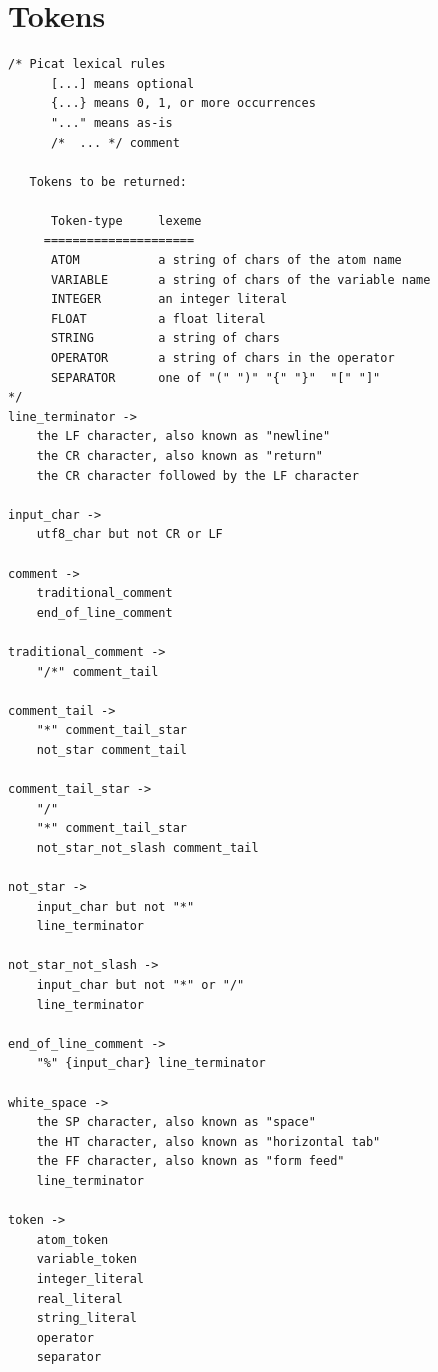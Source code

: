 
\chapter{\label{chapter:lex}Tokens}
\begin{scriptsize}
\begin{verbatim}
/* Picat lexical rules 
      [...] means optional
      {...} means 0, 1, or more occurrences
      "..." means as-is
      /*  ... */ comment

   Tokens to be returned:

      Token-type     lexeme
     =====================
      ATOM           a string of chars of the atom name
      VARIABLE       a string of chars of the variable name
      INTEGER        an integer literal
      FLOAT          a float literal
      STRING         a string of chars 
      OPERATOR       a string of chars in the operator
      SEPARATOR      one of "(" ")" "{" "}"  "[" "]"  
*/
line_terminator ->
    the LF character, also known as "newline"
    the CR character, also known as "return"
    the CR character followed by the LF character

input_char ->
    utf8_char but not CR or LF

comment ->
    traditional_comment
    end_of_line_comment

traditional_comment ->
    "/*" comment_tail

comment_tail ->
    "*" comment_tail_star
    not_star comment_tail

comment_tail_star ->
    "/"
    "*" comment_tail_star
    not_star_not_slash comment_tail

not_star ->
    input_char but not "*"
    line_terminator

not_star_not_slash ->
    input_char but not "*" or "/"
    line_terminator

end_of_line_comment ->
    "%" {input_char} line_terminator

white_space ->
    the SP character, also known as "space"
    the HT character, also known as "horizontal tab"
    the FF character, also known as "form feed"
    line_terminator

token ->
    atom_token
    variable_token
    integer_literal
    real_literal
    string_literal
    operator
    separator


\end{verbatim}
\end{scriptsize}
